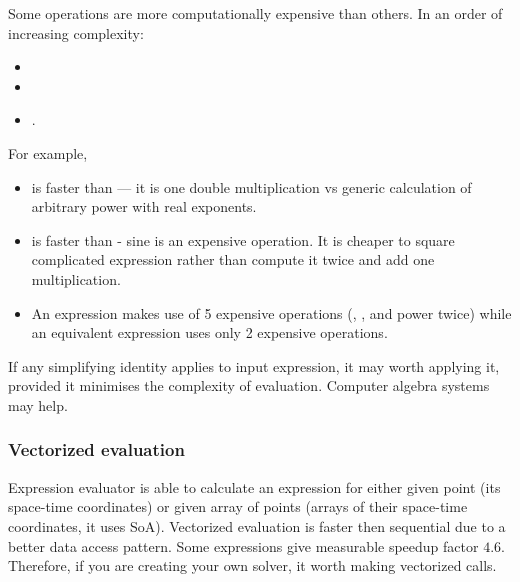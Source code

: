 Some operations are more computationally expensive than others. In an order of
increasing complexity:
\begin{itemize}
\item \inlsh{+, -, <, >, <=, >=, ==, }
\item {}
\item {}.
\end{itemize}

For example,
\begin{itemize}
\item {} is faster than  --- it is one double
multiplication vs generic calculation of arbitrary power with real exponents.
\item {} is faster than  -
sine is an expensive operation. It is cheaper to square complicated expression rather than
 compute it twice and add one multiplication.
\item An expression
 makes use of 5 expensive operations (, , 
 and power \inlsh{\^} twice) while an equivalent expression
 uses only 2 expensive operations.
\end{itemize}

If any simplifying identity applies to input expression, it may worth applying
it, provided it minimises the complexity of evaluation. Computer algebra systems
may help.

\subsubsection{Vectorized evaluation}

Expression evaluator is able to calculate an expression for either given point
(its space-time coordinates) or given array of points (arrays of their
space-time coordinates, it uses SoA). Vectorized evaluation is faster then
sequential due to a better data access pattern. Some expressions give measurable
speedup factor $4.6$. Therefore, if you are creating your own solver, it
worth making vectorized calls.
